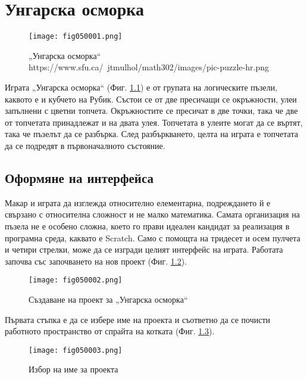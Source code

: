 ﻿\chapter{Унгарска осморка}

\begin{figure}[H]
  \centering
  \texttt{[image: fig050001.png]}
  \caption{„Унгарска осморка“ \\ https://www.sfu.ca/~jtmulhol/math302/images/pic-puzzle-hr.png}
\label{fig050001}
\end{figure}

Играта „Унгарска осморка“ (Фиг. \ref{fig050001}) е от групата на логическите пъзели, каквото е и кубчето на Рубик. Състои се от две пресичащи се окръжности, улеи запълнени с цветни топчета. Окръжностите се пресичат в две точки, така че две от топчетата принадлежат и на двата улея. Топчетата в улеите могат да се въртят, така че пъзелът да се разбърка. След разбъркването, целта на играта е топчетата да се подредят в първоначалното състояние. 

\section{Оформяне на интерфейса}

Макар и играта да изглежда относително елементарна, подреждането й е свързано с относителна сложност и не малко математика. Самата организация на пъзела не е особено сложна, което го прави идеален кандидат за реализация в програмна среда, каквато е Scratch. Само с помощта на тридесет и осем пулчета и четири стрелки, може да се изгради целият интерфейс на играта. Работата започва със започването на нов проект (Фиг. \ref{fig050002}).

\begin{figure}[H]
  \centering
  \texttt{[image: fig050002.png]}
  \caption{Създаване на проект за „Унгарска осморка“}
\label{fig050002}
\end{figure}

Първата стъпка е да се избере име на проекта и съответно да се почисти работното пространство от спрайта на котката (Фиг. \ref{fig050003}). 

\begin{figure}[H]
  \centering
  \texttt{[image: fig050003.png]}
  \caption{Избор на име за проекта}
\label{fig050003}
\end{figure}

